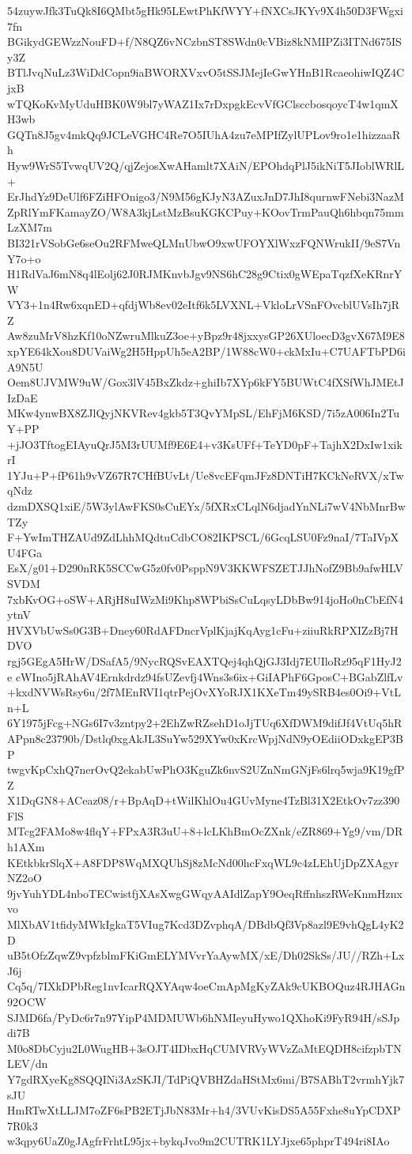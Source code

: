 54zuywJfk3TuQk8I6QMbt5gHk95LEwtPhKfWYY+fNXCsJKYv9X4h50D3FWgxi7fn
BGikydGEWzzNouFD+f/N8QZ6vNCzbnST8SWdn0cVBiz8kNMIPZi3ITNd675ISy3Z
BTlJvqNuLz3WiDdCopn9iaBWORXVxvO5tSSJMejIeGwYHnB1RcaeohiwIQZ4CjxB
wTQKoKvMyUduHBK0W9bl7yWAZ1Ix7rDxpgkEcvVfGClsccbosqoycT4w1qmXH3wb
GQTn8J5gv4mkQq9JCLeVGHC4Re7O5IUhA4zu7eMPIfZylUPLov9ro1e1hizzaaRh
Hyw9WrS5TvwqUV2Q/qjZejosXwAHamlt7XAiN/EPOhdqPlJ5ikNiT5JIoblWRlL+
ErJhdYz9DeUlf6FZiHFOnigo3/N9M56gKJyN3AZuxJnD7JhI8qurnwFNebi3NazM
ZpRlYmFKamayZO/W8A3kjLstMzBsuKGKCPuy+KOovTrmPauQh6hbqn75mmLzXM7m
BI321rVSobGe6seOu2RFMweQLMnUbwO9xwUFOYXlWxzFQNWrukII/9eS7VnY7o+o
H1RdVaJ6mN8q4lEolj62J0RJMKnvbJgv9NS6hC28g9Ctix0gWEpaTqzfXeKRnrYW
VY3+1n4Rw6xqnED+qfdjWb8ev02eItf6k5LVXNL+VkloLrVSnFOvcblUVsIh7jRZ
Aw8zuMrV8hzKf10oNZwruMlkuZ3oe+yBpz9r48jxxysGP26XUloecD3gvX67M9E8
xpYE64kXou8DUVaiWg2H5HppUh5eA2BP/1W88cW0+ckMxIu+C7UAFTbPD6iA9N5U
Oem8UJVMW9uW/Gox3lV45BxZkdz+ghiIb7XYp6kFY5BUWtC4fXSfWhJMEtJIzDaE
MKw4ynwBX8ZJlQyjNKVRev4gkb5T3QvYMpSL/EhFjM6KSD/7i5zA006In2TuY+PP
+jJO3TftogEIAyuQrJ5M3rUUMf9E6E4+v3KsUFf+TeYD0pF+TajhX2DxIw1xikrI
1YJu+P+fP61h9vVZ67R7CHfBUvLt/Ue8vcEFqmJFz8DNTiH7KCkNeRVX/xTwqNdz
dzmDXSQ1xiE/5W3ylAwFKS0sCuEYx/5fXRxCLqlN6djadYnNLi7wV4NbMnrBwTZy
F+YwImTHZAUd9ZdLhhMQdtuCdbCO82IKPSCL/6GcqLSU0Fz9naI/7TaIVpXU4FGa
EsX/g01+D290nRK5SCCwG5z0fv0PsppN9V3KKWFSZETJJhNofZ9Bb9afwHLVSVDM
7xbKvOG+oSW+ARjH8uIWzMi9Khp8WPbiSsCuLqsyLDbBw914joHo0nCbEfN4ytnV
HVXVbUwSs0G3B+Dney60RdAFDncrVplKjajKqAyg1cFu+ziiuRkRPXIZzBj7HDVO
rgj5GEgA5HrW/DSafA5/9NycRQSvEAXTQej4qhQjGJ3Idj7EUIloRz95qF1HyJ2e
cWIno5jRAhAV4Ernkdrdz94fsUZevfj4Wns3s6ix+GiIAPhF6GposC+BGabZlfLv
+kxdNVWsRsy6u/2f7MEnRVI1qtrPejOvXYoRJX1KXeTm49ySRB4es0Oi9+VtLn+L
6Y1975jFcg+NGs6I7v3zntpy2+2EhZwRZsehD1oJjTUq6XfDWM9difJf4VtUq5hR
APpn8c23790b/Dstlq0xgAkJL3SuYw529XYw0xKrcWpjNdN9yOEdiiODxkgEP3BP
twgvKpCxhQ7nerOvQ2ekabUwPhO3KguZk6nvS2UZnNmGNjFs6lrq5wja9K19gfPZ
X1DqGN8+ACeaz08/r+BpAqD+tWilKhlOu4GUvMyne4TzBl31X2EtkOv7zz390FlS
MTcg2FAMo8w4flqY+FPxA3R3uU+8+lcLKhBmOcZXnk/eZR869+Yg9/vm/DRh1AXm
KEtkbkrSlqX+A8FDP8WqMXQUhSj8zMcNd00hcFxqWL9c4zLEhUjDpZXAgyrNZ2oO
9jvYuhYDL4nboTECwistfjXAsXwgGWqyAAIdlZapY9OeqRffnhszRWeKnmHznxvo
MlXbAV1tfidyMWkIgkaT5VIug7Kcd3DZvphqA/DBdbQf3Vp8azl9E9vhQgL4yK2D
uB5tOfzZqwZ9vpfzblmFKiGmELYMVvrYaAywMX/xE/Dh02SkSs/JU//RZh+LxJ6j
Cq5q/7IXkDPbReg1nvIcarRQXYAqw4oeCmApMgKyZAk9cUKBOQuz4RJHAGn92OCW
SJMD6fa/PyDc6r7n97YipP4MDMUWb6hNMIeyuHywo1QXhoKi9FyR94H/sSJpdi7B
M0o8DbCyju2L0WugHB+3sOJT4IDbxHqCUMVRVyWVzZaMtEQDH8cifzpbTNLEV/dn
Y7gdRXyeKg8SQQINi3AzSKJI/TdPiQVBHZdaHStMx6mi/B7SABhT2vrmhYjk7sJU
HmRTwXtLLJM7oZF6sPB2ETjJbN83Mr+h4/3VUvKisDS5A55Fxhe8uYpCDXP7R0k3
w3qpy6UaZ0gJAgfrFrhtL95jx+bykqJvo9m2CUTRK1LYJjxe65phprT494ri8IAo
